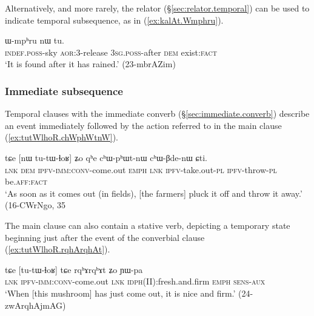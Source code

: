 Alternatively, and more rarely, the relator  (§\ref{sec:relator.temporal}) can be used to indicate temporal subsequence, as in (\ref{ex:kalAt.Wmphru}). 

 \begin{exe}
\ex \label{ex:kalAt.Wmphru}
\gll [tɯ-mɯ ka-lɤt] ɯ-mpʰru nɯ tu.    \\
 \textsc{indef}.\textsc{poss}-sky \textsc{aor}:3\flobv{}-release 3\textsc{sg}.\textsc{poss}-after \textsc{dem} exist:\textsc{fact} \\
\glt  `It is found after it has rained.' (23-mbrAZim)
\end{exe}

  
 \subsubsection{Immediate subsequence} \label{sec:immediate.subsequence}
Temporal clauses with the immediate converb (§\ref{sec:immediate.converb}) describe an event immediately followed by the action referred to in the main clause (\ref{ex:tutWlhoR.chWphWtnW}).
 
\begin{exe}
\ex \label{ex:tutWlhoR.chWphWtnW} 
\gll   tɕe [nɯ tu-tɯ-ɬoʁ] ʑo qʰe cʰɯ-pʰɯt-nɯ cʰɯ-βde-nɯ ɕti. \\
\textsc{lnk} \textsc{dem} \textsc{ipfv}-\textsc{imm}:\textsc{conv}-come.out \textsc{emph} \textsc{lnk} \textsc{ipfv}-take.out-\textsc{pl} \textsc{ipfv}-throw-\textsc{pl} be.\textsc{aff}:\textsc{fact} \\
\glt `As soon as it comes out (in fields), [the farmers] pluck it off and throw it away.' (16-CWrNgo, 35
 \end{exe}  
  
The main clause can also contain a stative verb, depicting a temporary state beginning just after the event of the converbial clause (\ref{ex:tutWlhoR.rqhArqhAt}).
 
\begin{exe}
\ex \label{ex:tutWlhoR.rqhArqhAt} 
\gll tɕe [tu-tɯ-ɬoʁ] tɕe rqʰɤrqʰɤt ʑo ɲɯ-pa  \\
\textsc{lnk} \textsc{ipfv}-\textsc{imm}:\textsc{conv}-come.out \textsc{lnk} \textsc{idph}(II):fresh.and.firm \textsc{emph} \textsc{sens}-\textsc{aux} \\
\glt `When [this mushroom] has just come out, it is nice and firm.' (24-zwArqhAjmAG)
  \end{exe}  
  
